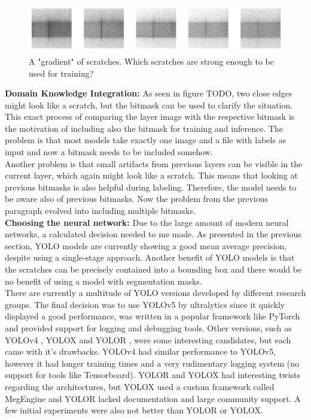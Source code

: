 \begin{figure}[!h]
\centering
\captionsetup{justification=centering,margin=2cm}
\includegraphics[width=\columnwidth]{images/introduction/original_scratch_fades}
\caption{A "gradient" of scratches. Which scratches are strong enough to be used for training?}
\label{intro:original_scratch_fades}
\end{figure}

\textbf{Domain Knowledge Integration:}
As seen in figure TODO, two close edges might look like a scratch, but the bitmask can be used to clarify the situation. This exact process of comparing the layer image with the respective bitmask is the motivation of including also the bitmask for training and inference. The problem is that most models take exactly one image and a file with labels as input and now a bitmask needs to be included somehow.\\
Another problem is that small artifacts from previous layers can be visible in the current layer, which again might look like a scratch. This means that looking at previous bitmasks is also helpful during labeling. Therefore, the model needs to be aware also of previous bitmasks. Now the problem from the previous paragraph evolved into including multiple bitmasks. \\


\textbf{Choosing the neural network:}
Due to the large amount of modern neural networks, a calculated decision needed to me made. As presented in the previous section, YOLO models are currently showing a good mean average precision, despite using a single-stage approach. Another benefit of YOLO models is that the scratches can be precisely contained into a bounding box and there would be no benefit of using a model with segmentation masks. \\
There are currently a multitude of YOLO versions developed by different research groups. The final decision was to use YOLOv5 by ultralytics \cite{yolov5_git} since it quickly displayed a good performance, was written in a popular framework like PyTorch and provided support for logging and debugging tools. Other versions, such as YOLOv4 \cite{yolov4_paper}, YOLOX \cite{yolox_paper} and YOLOR \cite{yolor_paper}, were some interesting candidates, but each came with it's drawbacks. YOLOv4 had similar performance to YOLOv5, however it had longer training times and a very rudimentary logging system (no support for tools like Tensorboard). YOLOR and YOLOX had interesting twists regarding the architectures, but YOLOX used a custom framework called MegEngine \cite{megengine_git} and YOLOR lacked documentation and large community support. A few initial experiments were also not better than YOLOR or YOLOX. \\


